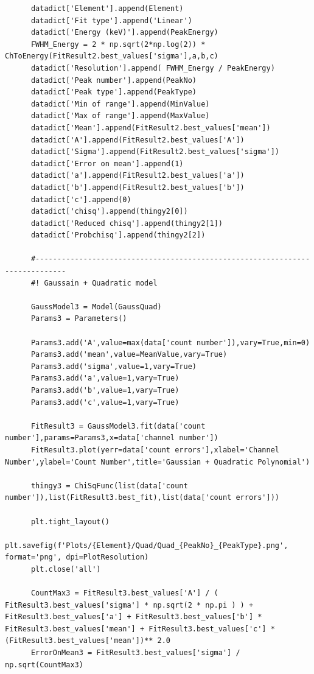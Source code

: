 \documentclass[11pt,a4paper]{article}
\begin{document}
\begin{verbatim}
      datadict['Element'].append(Element)
      datadict['Fit type'].append('Linear')
      datadict['Energy (keV)'].append(PeakEnergy)
      FWHM_Energy = 2 * np.sqrt(2*np.log(2)) * ChToEnergy(FitResult2.best_values['sigma'],a,b,c)
      datadict['Resolution'].append( FWHM_Energy / PeakEnergy)
      datadict['Peak number'].append(PeakNo)
      datadict['Peak type'].append(PeakType)
      datadict['Min of range'].append(MinValue)
      datadict['Max of range'].append(MaxValue)
      datadict['Mean'].append(FitResult2.best_values['mean'])
      datadict['A'].append(FitResult2.best_values['A'])
      datadict['Sigma'].append(FitResult2.best_values['sigma'])
      datadict['Error on mean'].append(1)
      datadict['a'].append(FitResult2.best_values['a'])
      datadict['b'].append(FitResult2.best_values['b'])
      datadict['c'].append(0)
      datadict['chisq'].append(thingy2[0])
      datadict['Reduced chisq'].append(thingy2[1])
      datadict['Probchisq'].append(thingy2[2])

      #-----------------------------------------------------------------------------
      #! Gaussain + Quadratic model 

      GaussModel3 = Model(GaussQuad)
      Params3 = Parameters()

      Params3.add('A',value=max(data['count number']),vary=True,min=0)
      Params3.add('mean',value=MeanValue,vary=True)
      Params3.add('sigma',value=1,vary=True)
      Params3.add('a',value=1,vary=True)
      Params3.add('b',value=1,vary=True)
      Params3.add('c',value=1,vary=True)

      FitResult3 = GaussModel3.fit(data['count number'],params=Params3,x=data['channel number'])
      FitResult3.plot(yerr=data['count errors'],xlabel='Channel Number',ylabel='Count Number',title='Gaussian + Quadratic Polynomial')

      thingy3 = ChiSqFunc(list(data['count number']),list(FitResult3.best_fit),list(data['count errors']))

      plt.tight_layout()
      plt.savefig(f'Plots/{Element}/Quad/Quad_{PeakNo}_{PeakType}.png', format='png', dpi=PlotResolution)
      plt.close('all')

      CountMax3 = FitResult3.best_values['A'] / ( FitResult3.best_values['sigma'] * np.sqrt(2 * np.pi ) ) + FitResult3.best_values['a'] + FitResult3.best_values['b'] * FitResult3.best_values['mean'] + FitResult3.best_values['c'] * (FitResult3.best_values['mean'])** 2.0
      ErrorOnMean3 = FitResult3.best_values['sigma'] / np.sqrt(CountMax3)


\end{verbatim}
\end{document}
